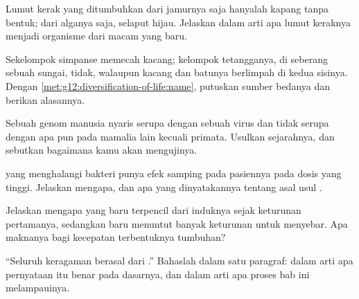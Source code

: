 \begin{exercise}[$\star\star$]\label{exo:g12:diversification-of-life:10}
Lumut kerak yang ditumbuhkan dari jamurnya saja hanyalah kapang tanpa
bentuk; dari alganya saja, selaput hijau. Jelaskan dalam arti apa lumut
keraknya menjadi organisme dari macam yang baru.
\end{exercise}

\begin{exercise}[$\star\star$]\label{exo:g12:diversification-of-life:11}
Sekelompok simpanse memecah kacang; kelompok tetangganya, di seberang
sebuah sungai, tidak, walaupun kacang dan batunya berlimpah di kedua
sisinya. Dengan \cref{met:g12:diversification-of-life:name}, putuskan
sumber bedanya dan berikan alasannya.
\end{exercise}

\begin{exercise}[$\star\star\star$]\label{exo:g12:diversification-of-life:12}
Sebuah  genom manusia nyaris serupa dengan sebuah  virus dan
tidak serupa dengan apa pun pada mamalia lain kecuali primata.
Usulkan sejarahnya, dan sebutkan bagaimana kamu akan mengujinya.
\end{exercise}

\begin{exercise}[$\star\star\star$]\label{exo:g12:diversification-of-life:13}
 yang menghalangi  bakteri punya efek samping pada
 pasiennya pada dosis yang tinggi. Jelaskan mengapa, dan apa
yang dinyatakannya tentang asal usul .
\end{exercise}

\begin{exercise}[$\star\star\star$]\label{exo:g12:diversification-of-life:14}
Jelaskan mengapa   yang baru terpencil dari induknya
sejak keturunan pertamanya, sedangkan  baru menuntut banyak
keturunan untuk menyebar. Apa maknanya bagi kecepatan terbentuknya
 tumbuhan?
\end{exercise}

\begin{exercise}[$\star\star\star$]\label{exo:g12:diversification-of-life:15}
``Seluruh keragaman berasal dari .'' Bahaslah dalam satu
paragraf: dalam arti apa pernyataan itu benar pada dasarnya, dan dalam
arti apa proses bab ini melampauinya.
\end{exercise}

